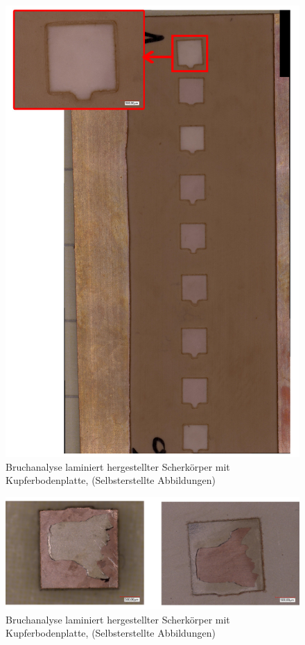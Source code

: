 \begin{figure}[H]
    \centering
    \includegraphics[scale=0.2]{Bilder/WhatsApp Image 2025-03-28 at 21.29.51.jpeg}
    \caption{Bruchanalyse laminiert hergestellter Scherkörper mit Kupferbodenplatte, (Selbsterstellte Abbildungen)}
    \label{lamWhats}
\end{figure}

\begin{figure}[H]
    \centering
    \includegraphics[scale=0.2]{Bilder/2s.png}
    \caption{Bruchanalyse laminiert hergestellter Scherkörper mit Kupferbodenplatte, (Selbsterstellte Abbildungen)}
    \label{lamWhats}
\end{figure}

